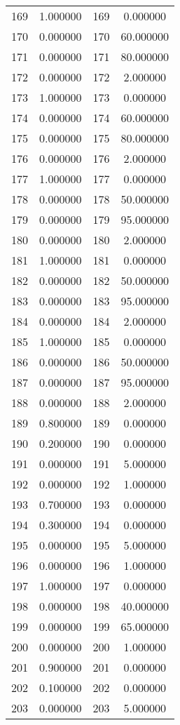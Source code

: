 \documentclass[12pt]{article}
\begin{document}
\begin{longtable}{@{}cccc@{}}
169 & 1.000000 & 169 & 0.000000 \\
170 & 0.000000 & 170 & 60.000000 \\
171 & 0.000000 & 171 & 80.000000 \\
172 & 0.000000 & 172 & 2.000000 \\
173 & 1.000000 & 173 & 0.000000 \\
174 & 0.000000 & 174 & 60.000000 \\
175 & 0.000000 & 175 & 80.000000 \\
176 & 0.000000 & 176 & 2.000000 \\
177 & 1.000000 & 177 & 0.000000 \\
178 & 0.000000 & 178 & 50.000000 \\
179 & 0.000000 & 179 & 95.000000 \\
180 & 0.000000 & 180 & 2.000000 \\
181 & 1.000000 & 181 & 0.000000 \\
182 & 0.000000 & 182 & 50.000000 \\
183 & 0.000000 & 183 & 95.000000 \\
184 & 0.000000 & 184 & 2.000000 \\
185 & 1.000000 & 185 & 0.000000 \\
186 & 0.000000 & 186 & 50.000000 \\
187 & 0.000000 & 187 & 95.000000 \\
188 & 0.000000 & 188 & 2.000000 \\
189 & 0.800000 & 189 & 0.000000 \\
190 & 0.200000 & 190 & 0.000000 \\
191 & 0.000000 & 191 & 5.000000 \\
192 & 0.000000 & 192 & 1.000000 \\
193 & 0.700000 & 193 & 0.000000 \\
194 & 0.300000 & 194 & 0.000000 \\
195 & 0.000000 & 195 & 5.000000 \\
196 & 0.000000 & 196 & 1.000000 \\
197 & 1.000000 & 197 & 0.000000 \\
198 & 0.000000 & 198 & 40.000000 \\
199 & 0.000000 & 199 & 65.000000 \\
200 & 0.000000 & 200 & 1.000000 \\
201 & 0.900000 & 201 & 0.000000 \\
202 & 0.100000 & 202 & 0.000000 \\
203 & 0.000000 & 203 & 5.000000 \\

\end{longtable}
\end{document}
